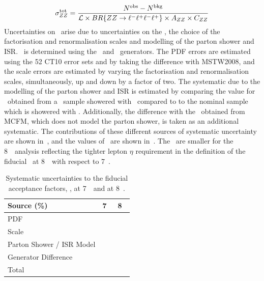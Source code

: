\begin{equation}\label{eq:xsectot_fourl}
\sigma_{ZZ}^{\rm tot} = \frac{ N^{\rm obs} - N^{\rm bkg}}{\mathcal{L} \times
BR\{{ZZ\rightarrow\ell^{-}\ell^{+}\ell^{-}\ell^{+}}\} \times A_{ZZ} \times C_{ZZ}}
\end{equation}
Uncertainties on \AZZ\ arise due to uncertainties on the \partDF, the choice of
the factorisation and renormalisation scales and modelling of the parton shower
and ISR. \AZZ\ is determined using the \powhegbox\ and \ggtwoZZ\ generators. The
PDF errors are estimated using the 52 CT10 error sets and by taking the
difference with MSTW2008, and the scale errors are estimated by varying the
factorisation and renormalisation scales, simultaneously, 
up and down by a factor of two. The systematic due to the modelling of the parton shower
and ISR is estimated by comparing the value for \AZZ\ obtained from a
\powhegbox\ sample showered with \herwig\ compared to to the nominal sample
which is showered with \pythia. Additionally, the difference with the \AZZ\
obtained from MCFM, which does not model the parton shower, is taken as an
additional systematic. The contributions of these different sources of
systematic uncertainty are shown in~\tab{azz-syst}, and the values of \AZZ\ are
shown in~\tab{azz}. The \AZZ\ are smaller for the 8~\tev\ analysis reflecting the tighter lepton $\eta$ 
requirement in the definition of the fiducial \phasespace\ at 8~\tev\ with
respect to 7~\tev.

\begin{table}
\renewcommand\arraystretch{1.1}
\centering
\small
  \begin{tabular}{lll}
    \hline\hline
     Source (\%) & 7~\tev & 8~\tev \\
    \hline
     PDF  & \ZZSevenTeVAZZPDFUncPercentage\ & \ZZEightTeVAZZPDFUncPercentage \\
     Scale  & \ZZSevenTeVAZZScaleUncPercentage\ & \ZZEightTeVAZZScaleUncPercentage \\
     Parton Shower / ISR Model  & \ZZSevenTeVAZZISRUncPercentage\ & \ZZEightTeVAZZISRUncPercentage \\
     Generator Difference  & \ZZSevenTeVAZZGenUncPercentage\ & \ZZEightTeVAZZGenUncPercentage \\
     \hline
     Total  & \ZZSevenTeVAZZTotalUncPercentage\ & \ZZEightTeVAZZTotalUncPercentage \\
    \hline\hline
  \end{tabular}

      \caption[Systematic uncertainties to the fiducial acceptance factors, \AZZ, at 7~\tev\ and at 8~\tev.]
      { Systematic uncertainties to the fiducial acceptance factors, \AZZ, at
      7~\tev\ and at 8~\tev. }
    \label{table:azz-syst}
\renewcommand\arraystretch{1}
\end{table}


